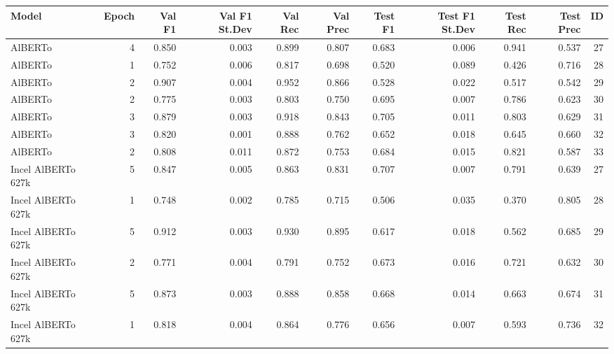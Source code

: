 \begin{tabular}{lrrrrrrrrrr}
\toprule
             Model &  Epoch &  Val F1 &  Val F1 St.Dev &  Val Rec &  Val Prec &  Test F1 &  Test F1 St.Dev &  Test Rec &  Test Prec &  ID \\
\midrule
           AlBERTo &      4 &   0.850 &          0.003 &    0.899 &     0.807 &    0.683 &           0.006 &     0.941 &      0.537 &  27 \\
           AlBERTo &      1 &   0.752 &          0.006 &    0.817 &     0.698 &    0.520 &           0.089 &     0.426 &      0.716 &  28 \\
           AlBERTo &      2 &   0.907 &          0.004 &    0.952 &     0.866 &    0.528 &           0.022 &     0.517 &      0.542 &  29 \\
           AlBERTo &      2 &   0.775 &          0.003 &    0.803 &     0.750 &    0.695 &           0.007 &     0.786 &      0.623 &  30 \\
           AlBERTo &      3 &   0.879 &          0.003 &    0.918 &     0.843 &    0.705 &           0.011 &     0.803 &      0.629 &  31 \\
           AlBERTo &      3 &   0.820 &          0.001 &    0.888 &     0.762 &    0.652 &           0.018 &     0.645 &      0.660 &  32 \\
           AlBERTo &      2 &   0.808 &          0.011 &    0.872 &     0.753 &    0.684 &           0.015 &     0.821 &      0.587 &  33 \\
Incel AlBERTo 627k &      5 &   0.847 &          0.005 &    0.863 &     0.831 &    0.707 &           0.007 &     0.791 &      0.639 &  27 \\
Incel AlBERTo 627k &      1 &   0.748 &          0.002 &    0.785 &     0.715 &    0.506 &           0.035 &     0.370 &      0.805 &  28 \\
Incel AlBERTo 627k &      5 &   0.912 &          0.003 &    0.930 &     0.895 &    0.617 &           0.018 &     0.562 &      0.685 &  29 \\
Incel AlBERTo 627k &      2 &   0.771 &          0.004 &    0.791 &     0.752 &    0.673 &           0.016 &     0.721 &      0.632 &  30 \\
Incel AlBERTo 627k &      5 &   0.873 &          0.003 &    0.888 &     0.858 &    0.668 &           0.014 &     0.663 &      0.674 &  31 \\
Incel AlBERTo 627k &      1 &   0.818 &          0.004 &    0.864 &     0.776 &    0.656 &           0.007 &     0.593 &      0.736 &  32 \\

\end{tabular}
